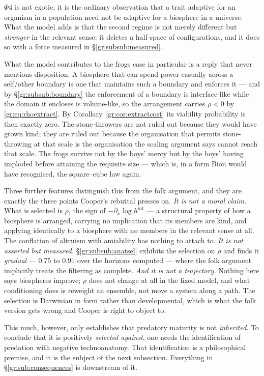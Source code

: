 \documentclass[11pt]{article}
\numberwithin{equation}{section}
\theoremstyle{plain}
\theoremstyle{definition}
\theoremstyle{remark}
\begin{document}
$\Phi4$ is not exotic; it is the ordinary observation that a trait
adaptive for an organism in a population need not be adaptive for a
biosphere in a universe. What the model adds is that the second regime
is not merely different but \emph{stronger} in the relevant sense: it
deletes a half-space of configurations, and it does so with a force
measured in \S\ref{gr:subsub:measured}.

What the model contributes to the frogs case in particular is a reply
that never mentions disposition. A biosphere that can spend power
casually across a self/other boundary is one that maintains such a
boundary and enforces it --- and by \S\ref{gr:subsub:boundary} the
enforcement of a boundary is interface-like while the domain it encloses
is volume-like, so the arrangement carries $\rho<0$ by
\eqref{gr:eq:rhoextract}. By Corollary~\ref{gr:cor:extractcost} its
viability probability is then exactly zero. The stone-throwers are not
ruled out because they would have grown kind; they are ruled out
because the organisation that permits stone-throwing at that scale is
the organisation the scaling argument says cannot reach that scale. The
frogs survive not by the boys' mercy but by the boys' having imploded
before attaining the requisite size --- which is, in a form Bion would
have recognised, the square--cube law again.

Three further features distinguish this from the folk argument, and they
are exactly the three points Cooper's rebuttal presses on. \emph{It is not
a moral claim.} What is selected is $\rho$, the sign of
$-\partial_x\log h^{\mathrm{int}}$ --- a structural property of how a
biosphere is arranged, carrying no implication that its members are
kind, and applying identically to a biosphere with no members in the
relevant sense at all. The conflation of altruism with amiability has
nothing to attach to. \emph{It is not asserted but measured.}
\S\ref{gr:subsub:anatsel} exhibits the selection on $\rho$ and finds it
\emph{gradual} --- $0.75$ to $0.91$ over the horizons computed ---
where the folk argument implicitly treats the filtering as complete.
\emph{And it is not a trajectory.} Nothing here says biospheres improve;
$\rho$ does not change at all in the fixed model, and what conditioning
does is reweight an ensemble, not move a system along a path. The
selection is Darwinian in form rather than developmental, which is
what the folk version gets wrong and Cooper is right to object to.

This much, however, only establishes that predatory maturity is not
\emph{inherited}. To conclude that it is positively \emph{selected
against}, one needs the identification of predation with negative
technoanatomy. That identification is a philosophical premise, and it is
the subject of the next subsection. Everything in
\S\ref{gr:sub:consequences} is downstream of it.
\end{document}
